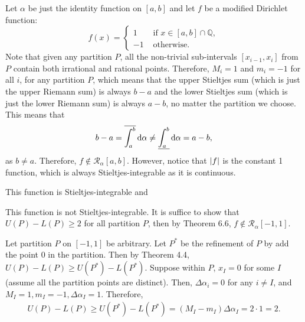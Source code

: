 \documentclass[12pt]{article}
\begin{document}
\begin{fproof}[3]
  Let \(\alpha\) be just the identity function on \([a,b]\) and let \(f\) be a modified Dirichlet function:
\[
f(x) = \begin{cases}
  1 &\text{ if } x \in [a,b] \cap \mathbb{Q},\\
  -1 &\text{ otherwise.}
\end{cases}
\]
Note that given any partition \(P\), all the non-trivial sub-intervals \([x_{i-1}, x_i]\) from \(P\) contain both irrational and rational points.
Therefore, \(M_i = 1\) and \(m_i = -1\) for all \(i\), for any partition \(P\), which means that the upper Stieltjes sum (which is just the upper Riemann sum) is always \(b-a\) and the lower Stieltjes sum (which is just the lower Riemann sum) is always \(a-b\), no matter the partition we choose.
This means that
\begin{align*}
  b-a = \overline{\int_{a}^{b}} \mathop{}\!\mathrm{d}\alpha \neq \underline{\int_{a}^{b}} \mathop{}\!\mathrm{d}\alpha = a-b,
\end{align*}
as \(b \neq a\).
Therefore, \(f \notin \mathcal{R}_{\alpha}[a,b]\).
However, notice that \(\left\lvert f \right\rvert\) is the constant 1 function, which is always Stieltjes-integrable as it is continuous.

\end{fproof}

\newpage

\begin{fproof}[4(a)]
  This function is Stieltjes-integrable and 
\end{fproof}

\begin{fproof}[4(b)]
\end{fproof}

\begin{fproof}[4(c)]
  This function is not Stieltjes-integrable.
  It is suffice to show that \(U(P) - L(P) \geq 2\) for all partition \(P\), then by Theorem 6.6, \(f \notin \mathcal{R}_{\alpha}[-1,1]\).
  
  Let partition \(P\) on \([-1,1]\) be arbitrary. Let \(P^*\) be the refinement of \(P\) by add the point \(0\) in the partition.
  Then by Theorem 4.4, \(U(P) - L(P) \geq U(P^*) - L(P^*)\).
  Suppose within \(P\), \(x_{I} = 0\) for some \(I\) (assume all the partition points are distinct).
  Then, \(\Delta \alpha_i = 0\) for any \(i \neq I\), and \(M_I = 1, m_I = -1, \Delta \alpha_I = 1\).
  Therefore,
  \begin{align*}
    U(P) - L(P) \geq U(P^*) - L(P^*) = (M_I - m_I) \Delta \alpha_I = 2 \cdot 1 = 2.
  \end{align*}

\end{fproof}

\begin{fproof}[4(d)]
\end{fproof}

\newpage

\begin{fproof}[5]
\end{fproof}
\end{document}
